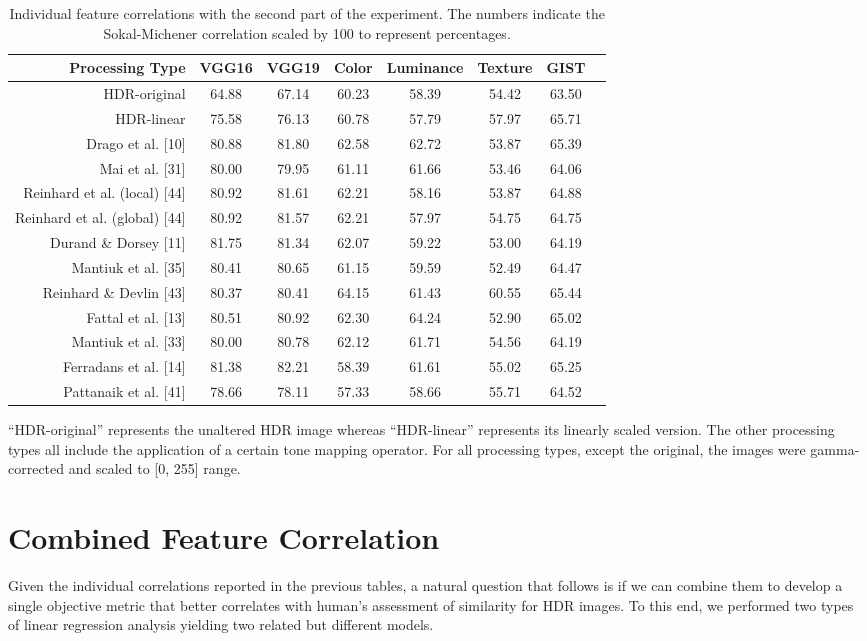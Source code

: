 \begin{sidewaystable}
\caption{Individual feature correlations with the second part of the experiment. The numbers indicate the Sokal-Michener correlation scaled by 100 to represent percentages.}
\centering
\begin{tabular}{r|c c c c c c c}
\label{tab:ind_correlation_p2}
\textbf{Processing Type} & \textbf{VGG16} & \textbf{VGG19} & \textbf{Color} & \textbf{Luminance} & \textbf{Texture} & \textbf{GIST}\\
\hline
HDR-original & 64.88 & 67.14 & 60.23 & 58.39 & 54.42 & 63.50 \\
HDR-linear & 75.58 & 76.13 & 60.78 & 57.79 & 57.97 & 65.71 \\
Drago et al. [10] & 80.88 & 81.80 & 62.58 & 62.72 & 53.87 & 65.39 \\
Mai et al. [31] & 80.00 & 79.95 & 61.11 & 61.66 & 53.46 & 64.06 \\
Reinhard et al. (local) [44] & 80.92 & 81.61 & 62.21 & 58.16 & 53.87 & 64.88 \\
Reinhard et al. (global) [44] & 80.92 & 81.57 & 62.21 & 57.97 & 54.75 & 64.75 \\
Durand \& Dorsey [11] & 81.75 & 81.34 & 62.07 & 59.22 & 53.00 & 64.19 \\
Mantiuk et al. [35] & 80.41 & 80.65 & 61.15 & 59.59 & 52.49 & 64.47 \\ 
Reinhard \& Devlin [43] & 80.37 & 80.41 & 64.15 & 61.43 & 60.55 & 65.44 \\
Fattal et al. [13] & 80.51 & 80.92 & 62.30 & 64.24 & 52.90 & 65.02 \\
Mantiuk et al. [33] & 80.00 & 80.78 & 62.12 & 61.71 & 54.56 & 64.19 \\
Ferradans et al. [14] & 81.38 & 82.21 & 58.39 & 61.61 & 55.02 & 65.25 \\
Pattanaik et al. [41] & 78.66 & 78.11 & 57.33 & 58.66 & 55.71 & 64.52
\end{tabular}
\end{sidewaystable}



“HDR-original” represents the unaltered HDR image whereas “HDR-linear” represents its linearly scaled version. The other processing types all include the application of a certain tone mapping operator. For all processing types, except the original, the images were gamma-corrected and scaled to [0, 255] range.
\section{Combined Feature Correlation}
Given the individual correlations reported in the previous tables, a natural question that follows is if we can combine them to develop a single objective metric that better correlates with human’s assessment of similarity for HDR images. To this end, we performed two types of linear regression analysis yielding two related
but different models.
